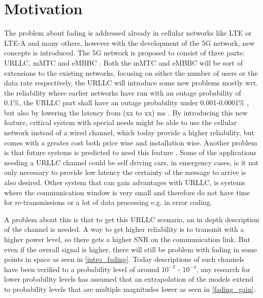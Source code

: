 \section{Motivation}
The problem about fading is addressed already in cellular networks like \gls{LTE} or \gls{LTE-A} and many others, however with the development of the 5G network, new concepts is introduced. The 5G network is proposed to consist of three parts: \Gls{URLLC}, \gls{mMTC} and \gls{eMBBC} \citep{Petar5G}. Both the \gls{mMTC} and \gls{eMBBC} will be sort of extensions to the existing networks, focusing on either the number of users or the data rate respectively, the \gls{URLLC} will introduce some new problems mostly wrt. the reliability where earlier networks have run with an outage probability of 0.1\%, the URLLC part shall have an outage probability under 0.001-0.0001\% , but also by lowering the latency from (xx to xx) ms . By introducing this new feature, critical system with special needs might be able to use the cellular network instead of a wired channel, which today provide a higher reliability, but comes with a greater cost both price wise and installation wise. Another problem is that future systems is predicted to need this feature . %
Some of the applications needing a URLLC channel could be self driving cars, in emergency cases, is it not only necessary to provide low latency the certainty of the message to arrive is also desired. %
Other system that can gain advantages with URLLC, is systems where the communication window is very small and therefore do not have time for re-transmissions or a lot of data processing e.g. in error coding.


A problem about this is that to get this URLLC scenario, an in depth description of the channel is needed. A way to get higher reliability is to transmit with a higher power level, so there gets a higher \gls{SNR} on the communication link. But even if the overall signal is higher, there will still be problem with fading in some points in space as seen in \autoref{intro_fading}. Today descriptions of such channels have been verified to a probability level of around $10^{-3}$ - $10^{-4}$, any research for lower probability levels has assumed that an extrapolation of the models extend to probability levels that are multiple magnitudes lower as seen in \autoref{fading_gain}.


